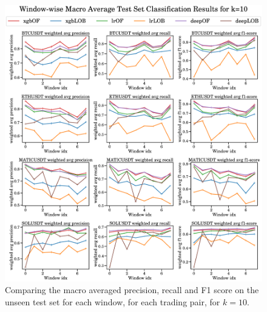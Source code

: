 \begin{figure}[htpb!]
    \centering
    \includegraphics[width=1.0\textwidth]{./images/macro_results_k=10.pdf}
    \caption{Comparing the macro averaged precision, recall and F1 score on the unseen test set for each window, for each trading pair, for $k=10$.}
    \label{macro_plots_2}
\end{figure}

